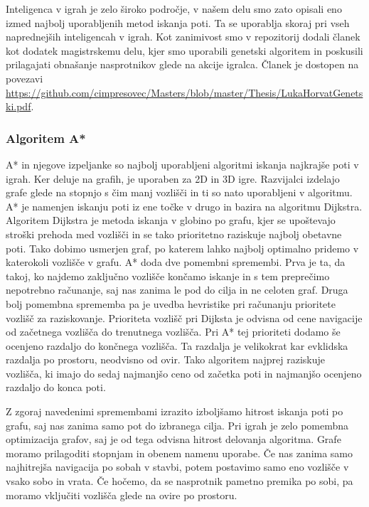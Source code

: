 \documentclass[12pt,a4paper,twoside]{book}
\begin{document}
Inteligenca v igrah je zelo široko področje, v našem delu smo zato opisali eno izmed najbolj uporabljenih metod iskanja poti. Ta se uporablja skoraj pri vseh naprednejših inteligencah v igrah. Kot zanimivost smo v repozitorij dodali članek kot dodatek magistrskemu delu, kjer smo uporabili genetski algoritem in poskusili prilagajati obnašanje nasprotnikov glede na akcije igralca. Članek je dostopen na povezavi \url{https://github.com/cimpresovec/Masters/blob/master/Thesis/LukaHorvatGenetski.pdf}.

\subsubsection{Algoritem A*}

A* in njegove izpeljanke so najbolj uporabljeni algoritmi iskanja najkrajše poti v igrah. Ker deluje na grafih, je uporaben za 2D in 3D igre. Razvijalci izdelajo grafe glede na stopnjo s čim manj vozlišči in ti so nato uporabljeni v algoritmu. A* je namenjen iskanju poti iz ene točke v drugo in bazira na algoritmu Dijkstra. Algoritem Dijkstra je metoda iskanja v globino po grafu, kjer se upoštevajo stroški prehoda med vozlišči in se tako prioritetno raziskuje najbolj obetavne poti. Tako dobimo usmerjen graf, po katerem lahko najbolj optimalno pridemo v katerokoli vozlišče v grafu. A* doda dve pomembni spremembi. Prva je ta, da takoj, ko najdemo zaključno vozlišče končamo iskanje in s tem preprečimo nepotrebno računanje, saj nas zanima le pod do cilja in ne celoten graf. Druga bolj pomembna sprememba pa je uvedba hevristike pri računanju prioritete vozlišč za raziskovanje. Prioriteta vozlišč pri Dijksta je odvisna od cene navigacije od začetnega vozlišča do trenutnega vozlišča. Pri A* tej prioriteti dodamo še ocenjeno razdaljo do končnega vozlišča. Ta razdalja je velikokrat kar evklidska razdalja po prostoru, neodvisno od ovir. Tako algoritem najprej raziskuje vozlišča, ki imajo do sedaj najmanjšo ceno od začetka poti in najmanjšo ocenjeno razdaljo do konca poti. 

Z zgoraj navedenimi spremembami izrazito izboljšamo hitrost iskanja poti po grafu, saj nas zanima samo pot do izbranega cilja. Pri igrah je zelo pomembna optimizacija grafov, saj je od tega odvisna hitrost delovanja algoritma. Grafe moramo prilagoditi stopnjam in obenem namenu uporabe. Če nas zanima samo najhitrejša navigacija po sobah v stavbi, potem postavimo samo eno vozlišče v vsako sobo in vrata. Če hočemo, da se nasprotnik pametno premika po sobi, pa moramo vključiti vozlišča glede na ovire po prostoru.
\end{document}
